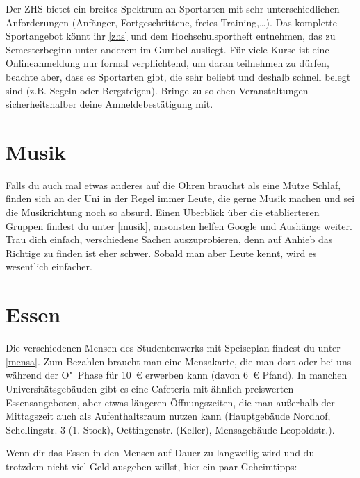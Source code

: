 Der ZHS bietet ein breites Spektrum an Sportarten mit sehr unterschiedlichen
Anforderungen (Anfänger, Fortgeschrittene, freies Training,\ldots). Das
komplette Sportangebot könnt ihr \ref{zhs} und dem Hochschulsportheft
entnehmen, das zu Semesterbeginn unter anderem im Gumbel ausliegt. Für viele
Kurse ist eine Onlineanmeldung nur formal verpflichtend, um daran teilnehmen zu
dürfen, beachte aber, dass es Sportarten gibt, die sehr beliebt und deshalb
schnell belegt sind (z.B. Segeln oder Bergsteigen). Bringe zu solchen
Veranstaltungen sicherheitshalber deine Anmeldebestätigung mit.

\begin{urlList}
\end{urlList}

\section{Musik}
Falls du auch mal etwas anderes auf die Ohren brauchst als eine
Mütze Schlaf, finden sich an der Uni in der Regel immer Leute, die gerne Musik
machen und sei die Musikrichtung noch so absurd. Einen Überblick über die
etablierteren Gruppen findest du unter \ref{musik}, ansonsten helfen Google und
Aushänge weiter. Trau dich einfach, verschiedene Sachen auszuprobieren, denn
auf Anhieb das Richtige zu finden ist eher schwer. Sobald man aber Leute kennt,
wird es wesentlich einfacher.

\begin{urlList}
\end{urlList}


\section{Essen}
Die verschiedenen Mensen des Studentenwerks mit Speiseplan findest du unter \ref{mensa}. Zum Bezahlen braucht man eine Mensakarte, die man dort oder bei uns während der O"~Phase für 10~€ erwerben kann (davon 6~€ Pfand). In manchen Universitätsgebäuden gibt es eine Cafeteria mit ähnlich preiswerten Essensangeboten, aber etwas längeren Öffnungszeiten, die man außerhalb der Mittagszeit auch als Aufenthaltsraum nutzen kann (Hauptgebäude Nordhof, Schellingstr. 3 (1. Stock), Oettingenstr. (Keller), Mensagebäude Leopoldstr.).

Wenn dir das Essen in den Mensen auf Dauer zu langweilig wird und du trotzdem nicht viel Geld ausgeben willst, hier ein paar Geheimtipps:


